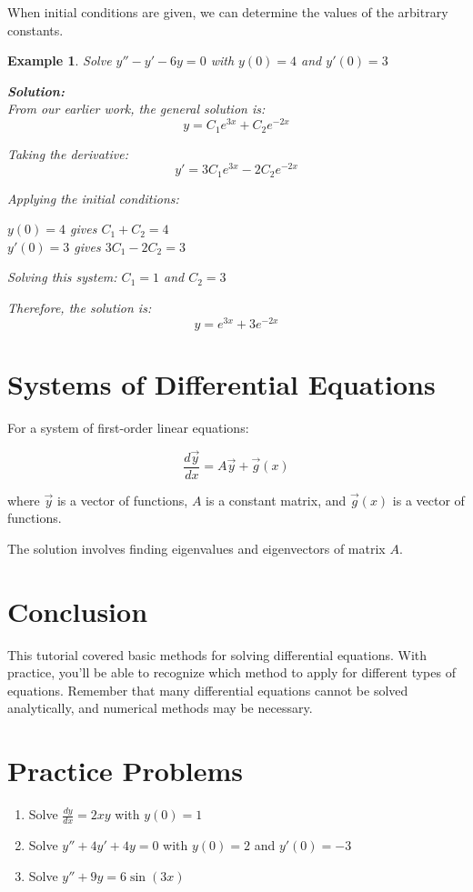 \documentclass{article}
\newtheorem{example}{Example}
\begin{document}
When initial conditions are given, we can determine the values of the arbitrary constants.

\begin{example}
Solve $y'' - y' - 6y = 0$ with $y(0) = 4$ and $y'(0) = 3$

\textbf{Solution:}\\
From our earlier work, the general solution is:
\begin{equation}
y = C_1e^{3x} + C_2e^{-2x}
\end{equation}

Taking the derivative:
\begin{equation}
y' = 3C_1e^{3x} - 2C_2e^{-2x}
\end{equation}

Applying the initial conditions:

$y(0) = 4$ gives $C_1 + C_2 = 4$\\
$y'(0) = 3$ gives $3C_1 - 2C_2 = 3$

Solving this system:
$C_1 = 1$ and $C_2 = 3$

Therefore, the solution is:
\begin{equation}
y = e^{3x} + 3e^{-2x}
\end{equation}
\end{example}

\section{Systems of Differential Equations}

For a system of first-order linear equations:

\begin{equation}
\frac{d\vec{y}}{dx} = A\vec{y} + \vec{g}(x)
\end{equation}

where $\vec{y}$ is a vector of functions, $A$ is a constant matrix, and $\vec{g}(x)$ is a vector of functions.

The solution involves finding eigenvalues and eigenvectors of matrix $A$.

\section{Conclusion}

This tutorial covered basic methods for solving differential equations. With practice, you'll be able to recognize which method to apply for different types of equations. Remember that many differential equations cannot be solved analytically, and numerical methods may be necessary.

\section{Practice Problems}

\begin{enumerate}
\item Solve $\frac{dy}{dx} = 2xy$ with $y(0) = 1$
\item Solve $y'' + 4y' + 4y = 0$ with $y(0) = 2$ and $y'(0) = -3$
\item Solve $y'' + 9y = 6\sin(3x)$
\end{enumerate}
\end{document}
